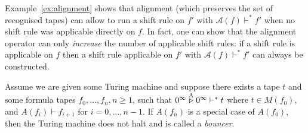 \begin{remark}
    Example~\ref{ex:alignment} shows that alignment (which preserves the set of recognised tapes) can allow to run a shift rule on $f'$ with $\mathcal{A}(f) \vdash^* f'$ when no shift rule was applicable directly on $f$. In fact, one can show that the alignment operator can only \textit{increase} the number of applicable shift rules: if a shift rule is applicable on $f$ then a shift rule applicable on $f'$ with $\mathcal{A}(f) \vdash^* f'$ can always be constructed.
\end{remark}


\begin{theorem}\label{th:bouncers}
    Assume we are given some Turing machine and suppose there exists a tape $t$ and some formula tapes $f_0,\dots,f_n, n\geq 1$, such that $0^\infty \stackrel{\text{A}}\triangleright 0^\infty \vdash^* t$ where $t \in M(f_0)$, and $A(f_i) \vdash f_{i+1}$ for $i=0,\dots,n-1$. If $A(f_n)$ is a special case of $A(f_0)$, then the Turing machine does not halt and is called a \textit{bouncer}.
\end{theorem}






